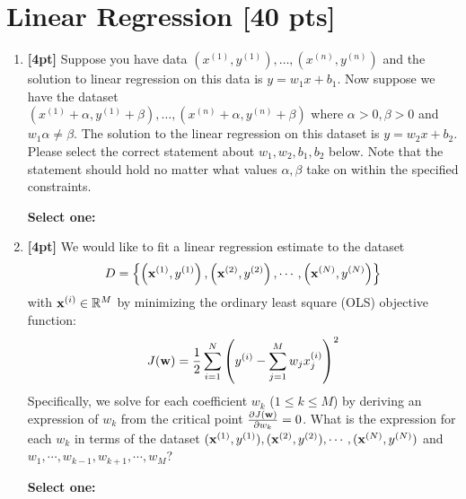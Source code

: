 \section{Linear Regression [40 pts]}
\begin{enumerate}

    \item \textbf{[4pt]} Suppose you have data ${(x^{(1)}, y^{(1)}), \ldots, (x^{(n)}, y^{(n)})}$ and the solution to linear regression on this data is $y = w_1 x + b_1$. Now suppose we have the dataset \\
    ${(x^{(1)} + \alpha, y^{(1)} + \beta), \ldots, (x^{(n)} + \alpha, y^{(n)} + \beta)}$ where $\alpha > 0, \beta > 0$ and $w_1 \alpha \neq \beta$. The solution to the linear regression on this dataset is $y = w_2 x + b_2$. Please select the correct statement about $w_1, w_2, b_1, b_2$ below. Note that the statement should hold no matter what values $\alpha, \beta$ take on within the specified constraints.
    
    \textbf{Select one:}
    

    \item \textbf{[4pt]} We would like to fit a linear regression estimate to the dataset 
    $$
    D = \left\{\left(\mathbf{x}^{(1)},y^{(1)}\right), \left(\mathbf{x}^{(2)},y^{(2)}\right),\cdots, \left(\mathbf{x}^{(N)},y^{(N)}\right)\right\}
    $$ with $\mathbf{x}^{(i)} \in \mathbb{R}^M$ by minimizing the ordinary least square (OLS) objective function:
    $$
    J(\mathbf{w}) = \frac{1}{2}\sum_{i=1}^N\left(y^{(i)} - \sum_{j=1}^M w_j x_j^{(i)}\right)^2
    $$
    Specifically, we solve for each coefficient $w_k$ ($1\leq k\leq M$) by deriving an expression of $w_k$ from the critical point $\frac{\partial J(\mathbf{w})}{\partial w_k} = 0$. What is the expression for each $w_k$ in terms of the dataset $(\mathbf{x}^{(1)},y^{(1)}), (\mathbf{x}^{(2)},y^{(2)}),\cdots, (\mathbf{x}^{(N)},y^{(N)})$ and $w_1,\cdots,w_{k-1},w_{k+1},\cdots,w_M$?

    \textbf{Select one:}


\end{enumerate}
